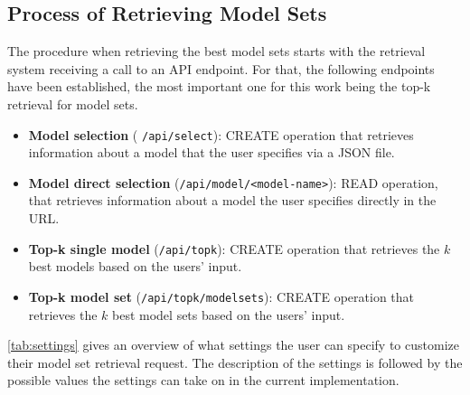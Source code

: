 \subsection{Process of Retrieving Model Sets}

The procedure when retrieving the best model sets starts with the retrieval system receiving a call to an API endpoint. For that, the following endpoints have been established, the most important one for this work being the top-k retrieval for model sets.

\begin{itemize}

\item \textbf{Model selection} ( \texttt{/api/select}): CREATE operation that retrieves information about a model that the user specifies via a JSON file. 
\item \textbf{Model direct selection} (\texttt{/api/model/<model-name>}): READ operation, that retrieves information about a model the user specifies directly in the URL.
\item \textbf{Top-k single model} (\texttt{/api/topk}): CREATE operation that retrieves the $k$ best models based on the users' input.
\item \textbf{Top-k model set} (\texttt{/api/topk/modelsets}): CREATE operation that retrieves the $k$ best model sets based on the users' input.
\end{itemize}

\autoref{tab:settings} gives an overview of what settings the user can specify to customize their model set retrieval request. The description of the settings is followed by the possible values the settings can take on in the current implementation.


